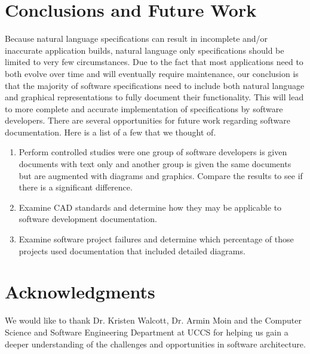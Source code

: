 \documentclass{acm_proc_article-sp}
\begin{document}
\section{Conclusions and Future Work}
Because natural language specifications can result in incomplete and/or inaccurate application builds, natural language only specifications should be limited to very few circumstances. Due to the fact that most applications need to both evolve over time and will eventually require maintenance, our conclusion is that the majority of software specifications need to include both natural language and graphical representations to fully document their functionality. This will lead to more complete and accurate implementation of specifications by software developers.
\newline
There are several opportunities for future work regarding software documentation. Here is a list of a few that we thought of.
\begin{enumerate}
	\item Perform controlled studies were one group of software developers is given documents with text only and another group is given the same documents but are augmented with diagrams and graphics. Compare the results to see if there is a significant difference.
	\item Examine CAD standards and determine how they may be applicable to software development documentation.
	\item Examine software project failures and determine which percentage of those projects used documentation that included detailed diagrams. 
\end{enumerate}

\section{Acknowledgments}
We would like to thank Dr. Kristen Walcott, Dr. Armin Moin and the Computer Science and Software Engineering Department at UCCS for helping us gain a deeper understanding of the challenges and opportunities in software architecture.

 
%

%
%

\balancecolumns
\end{document}
